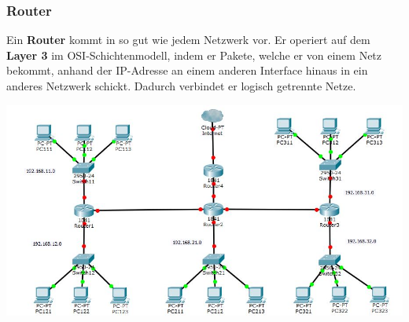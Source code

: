 \documentclass[12pt,a4paper]{report}
\begin{document}
\begin{onehalfspace}
\subsubsection{Router}
Ein \textbf{Router} kommt in so gut wie jedem Netzwerk vor. Er operiert auf dem \textbf{Layer 3} im OSI-Schichtenmodell, indem er Pakete, welche er von einem Netz bekommt, anhand der IP-Adresse an einem anderen Interface hinaus in ein anderes Netzwerk schickt. Dadurch verbindet er logisch getrennte Netze.\\

\begin{center}
\includegraphics[scale=0.5]{../docs/tarkes/pics/RouterNetwork.jpg}\label{fig:bspNetwork}
\end{center}


\end{onehalfspace}
\end{document}
